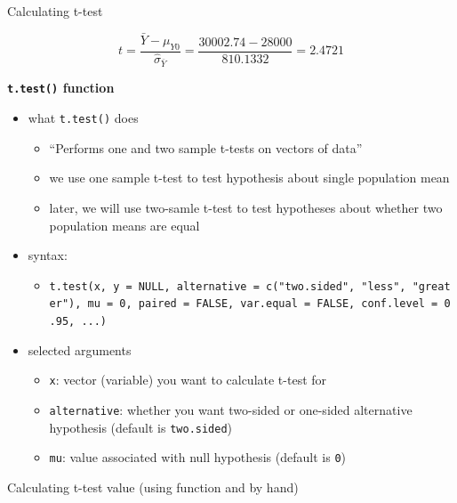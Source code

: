 \documentclass[
  letterpaper,
  DIV=11,
  numbers=noendperiod]{scrartcl}
\providecommand{\tightlist}{%
  \setlength{\itemsep}{0pt}\setlength{\parskip}{0pt}}\usepackage{longtable,booktabs,array}
\begin{document}
Calculating t-test

\[t = \frac{\bar{Y} - \mu_{Y0}}{\hat{\sigma}_{\bar{Y}}} = \frac{30002.74 - 28000}{810.1332} = 2.4721\]

\textbf{\texttt{t.test()} function}

\begin{itemize}
\tightlist
\item
  what \texttt{t.test()} does

  \begin{itemize}
  \tightlist
  \item
    ``Performs one and two sample t-tests on vectors of data''
  \item
    we use one sample t-test to test hypothesis about single population
    mean
  \item
    later, we will use two-samle t-test to test hypotheses about whether
    two population means are equal
  \end{itemize}
\item
  syntax:

  \begin{itemize}
  \tightlist
  \item
    \texttt{t.test(x,\ y\ =\ NULL,\ alternative\ =\ c("two.sided",\ "less",\ "greater"),\ mu\ =\ 0,\ paired\ =\ FALSE,\ var.equal\ =\ FALSE,\ conf.level\ =\ 0.95,\ ...)}
  \end{itemize}
\item
  selected arguments

  \begin{itemize}
  \tightlist
  \item
    \texttt{x}: vector (variable) you want to calculate t-test for
  \item
    \texttt{alternative}: whether you want two-sided or one-sided
    alternative hypothesis (default is \texttt{two.sided})
  \item
    \texttt{mu}: value associated with null hypothesis (default is
    \texttt{0})
  \end{itemize}
\end{itemize}

Calculating t-test value (using function and by hand)
\end{document}
